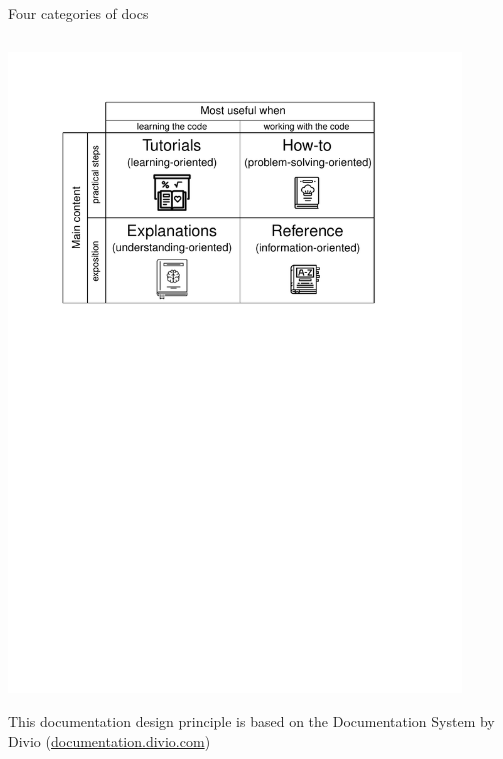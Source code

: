 \documentclass[english,aspectratio=169]{beamer}
\begin{document}
\begin{frame}{Four categories of docs}
\begin{columns}[onlytextwidth]
\begin{column}{0.5\textwidth}
    \begin{center}
    \includegraphics[width=0.9\textwidth]{./figures/documentation-system}
    \end{center}
    \vspace{-0.5em}
    \begin{exampleblock}{}
        \centering
        This documentation design principle is based on the Documentation System by Divio
        (\url{documentation.divio.com})
    \end{exampleblock}
\end{column}

\end{columns}

\end{frame}
\end{document}
